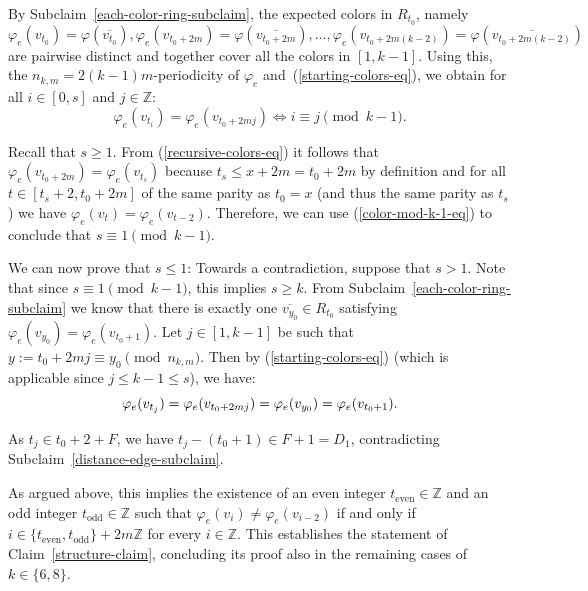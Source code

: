 \documentclass[a4paper,10pt,hidelinks]{amsart}
\renewcommand{\phi}{\ensuremath{\varphi}}
\newenvironment{claimproof}[1][\proofname]{\proof[#1]\renewcommand{\qedsymbol}{$\blacksquare$}}{\endproof}
\theoremstyle{definition}
\begin{document}
\begin{claimproof}[Proof of Claim~\ref{structure-claim} when $k \in \{6,8\}$]
        By Subclaim~\ref{each-color-ring-subclaim}, the expected colors in $R_{t_0}$, namely $$\phi_e(v_{t_0})=\phi(\overline{v_{t_0}}), \phi_e(v_{t_0+2m})=\phi(\overline{v_{t_0+2m}}),\ldots,\phi_e(v_{t_0+2m(k-2)})=\phi(\overline{v_{t_0+2m(k-2)}})$$ are pairwise distinct and together cover all the colors in $[1,k-1]$. Using this, the $n_{k,m}=2(k-1)m$-periodicity of $\phi_e$ and~(\ref{starting-colors-eq}), we obtain for all $i\in [0,s]$ and $j\in \mathbb{Z}$:
        \begin{equation}\label{color-mod-k-1-eq}
            \varphi_e(v_{t_i}) = \varphi_e(v_{t_0 + 2mj}) \iff i \equiv j \pmod{k-1}.
        \end{equation}

        Recall that $s \geq 1$. From (\ref{recursive-colors-eq}) it follows that $\varphi_e(v_{t_0 + 2m}) = \varphi_e(v_{t_s})$ because $t_s \leq x+2m=t_0+2m$ by definition and for all $t \in [t_s+2, t_0 + 2m]$ of the same parity as $t_0=x$ (and thus the same parity as $t_s$) we have $\varphi_e(v_t) = \varphi_e(v_{t-2})$. Therefore, we can use (\ref{color-mod-k-1-eq}) to conclude that $s \equiv 1 \pmod{k - 1}$. 
        
        We can now prove that $s \leq 1$: Towards a contradiction, suppose that $s > 1$. Note that since $s\equiv 1 \pmod{k-1}$, this implies $s\ge k$. 
        From Subclaim~\ref{each-color-ring-subclaim} we know that there is exactly one $\overline{v_{y_0}} \in R_{t_0}$ satisfying $\varphi_e(v_{y_0}) = \varphi_e(v_{t_0 + 1})$. Let $j \in [1, k-1]$ be such that $y := t_0 + 2mj \equiv y_0 \pmod{n_{k,m}}$. Then by (\ref{starting-colors-eq}) (which is applicable since $j\le k-1\le s$), we have:
        \begin{equation}\notag
            \varphi_e(v_{t_j}) = \varphi_e(v_{t_0 + 2mj}) = \varphi_e(v_{y_0})=\varphi_e(v_{t_0+1}).
        \end{equation}
        

        As $t_j \in t_0 + 2 + F$, we have $t_j - (t_0 + 1)\in F+1 =D_1$, contradicting Subclaim~\ref{distance-edge-subclaim}. 

As argued above, this implies the existence of an even integer $t_{\text{even}} \in \mathbb{Z}$ and an odd integer $t_{\text{odd}} \in \mathbb{Z}$ such that $\varphi_e(v_i) \neq \varphi_e(v_{i - 2})$ if and only if $i \in \{t_{\text{even}}, t_{\text{odd}}\} + 2m\mathbb{Z}$ for every $i\in \mathbb{Z}$. This establishes the statement of Claim~\ref{structure-claim}, concluding its proof also in the remaining cases of $k\in \{6,8\}$. 
 

    \end{claimproof}
\end{document}
